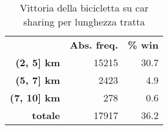 \begin{table}[H]
	\centering
	
	\begin{tabular}{ | r r r | }
		\hline
		& \textbf{Abs. freq.} & \textbf{\% win} \\
		\textbf{(2, 5] km} & 15215 & 30.7 \\
		\textbf{(5, 7] km} & 2423 & 4.9 \\
		\textbf{(7, 10] km} & 278 & 0.6 \\
		\hline
		\textbf{totale} & 17917 & 36.2 \\
		\hline
	\end{tabular}
	
	\caption{Vittoria della bicicletta su car sharing per lunghezza tratta}
	\label{table:6}
\end{table}







